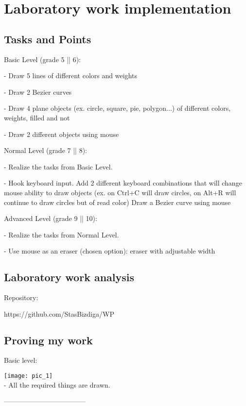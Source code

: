 \section{Laboratory work implementation}

\subsection{Tasks and Points}

Basic Level (grade 5 || 6):

-    Draw 5 lines of different colors and weights

-    Draw 2 Bezier curves

-    Draw 4 plane objects (ex. circle, square, pie, polygon...) of different colors, weights, filled and not

-    Draw 2 different objects using mouse

Normal Level (grade 7 || 8):

-    Realize the tasks from Basic Level.

-    Hook keyboard input. Add 2 different keyboard combinations that will change mouse ability to draw objects (ex. on Ctrl+C will draw circles, on Alt+R will continue to draw circles but of read color)
    Draw a Bezier curve using mouse

Advanced Level (grade 9 || 10):

-    Realize the tasks from Normal Level.

-    Use mouse as an eraser (chosen option): eraser with adjustable width





\subsection{Laboratory work analysis}
Repository:

https://github.com/StasBizdiga/WP

\subsection{Proving my work}

Basic level:

\texttt{[image: pic\_1]} \\

- All the required things are drawn.

------------------------------------ \\

